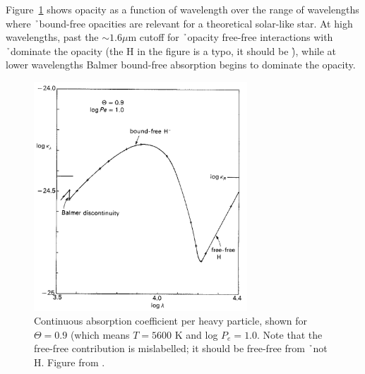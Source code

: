 Figure~\ref{fig:bohmopacity} shows  opacity as a function of wavelength over the range of wavelengths where \h\ bound-free opacities are relevant for a theoretical solar-like star.  At high wavelengths, past the $\sim 1.6 \mu$m cutoff for \h\ opacity free-free interactions with \h\ dominate the opacity (the H in the figure is a typo, it should be \h), while at lower wavelengths Balmer bound-free absorption begins to dominate the opacity.
\begin{figure}
\includegraphics[width=80mm]{figs/hminusopacity.png}
\caption{\label{fig:bohmopacity}Continuous absorption coefficient per heavy particle, shown for $\Theta=0.9$ (which means $T=5600$ K and log $P_e=1.0$.  Note that the free-free contribution is mislabelled; it should be free-free from \h\ not H.  Figure from \cite{boehm1989}.}
\end{figure}

